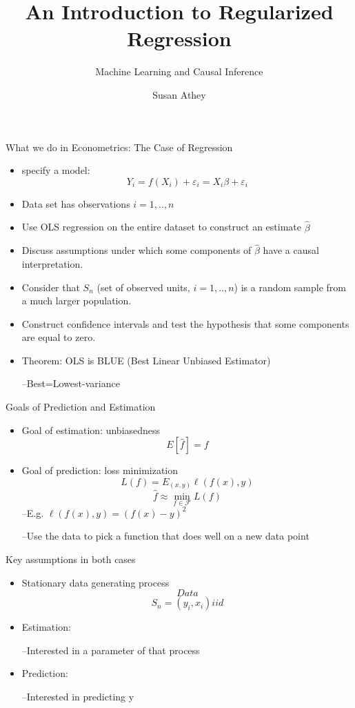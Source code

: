 \documentclass{beamer}
\title{An Introduction to Regularized Regression}
\subtitle{Machine Learning and Causal Inference}
\author{Susan Athey}
\begin{document}
	
\begin{frame}
\titlepage
\end{frame}

\begin{frame}{What we do in Econometrics: The Case of Regression}
	\begin{itemize}
		\item specify a model:
		$$Y_i=f\left( X_i\right) +\varepsilon_i=X_i\beta+\varepsilon_i$$
		\item Data set has observations $i=1,..,n$
		\item Use OLS regression on the entire dataset to construct an estimate $\hat{\beta}$	
		\item Discuss assumptions under which some components of $\hat{\beta}$ have a causal interpretation.
		\item Consider that $S_{n}$ (set of observed units, $i=1,..,n$) is a random sample from a much larger population.
		\item Construct confidence intervals and test the hypothesis that some components are equal to zero.	
		\item Theorem: OLS is BLUE (Best Linear Unbiased Estimator)
		
		--Best=Lowest-variance
	\end{itemize}

\end{frame}

\begin{frame}{Goals of Prediction and Estimation}
	\begin{itemize}
		\item Goal of estimation: unbiasedness
		$$E[ \hat{f}] =f$$
		\item Goal of prediction: loss minimization
		$$L\left( f \right) =E_{(x,y)}\ell (f(x),y)$$
		$$\hat{f}\approx\min_{f \in \mathcal{F}}L(f)$$
		--E.g. $\ell(f(x),y)=(f(x)-y)^2$
		
		--Use the data to pick a function that does well on a new data point
	\end{itemize}
\end{frame}

\begin{frame}{Key assumptions in both cases}
	\begin{itemize}
		\item Stationary data generating process
		$$Data$$
		$$S_n=(y_i,x_i) iid$$
		\item Estimation:
		
		--Interested in a parameter of that process
		\item Prediction:
		
		--Interested in predicting y
	\end{itemize}
\end{frame}
\end{document}
